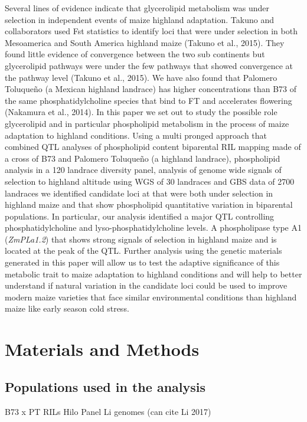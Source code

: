 \documentclass[9pt,twocolumn,twoside,lineno]{gsajnl}
\begin{document}
Several lines of evidence indicate that glycerolipid metabolism was under selection in independent events of maize highland adaptation. 
Takuno and collaborators used Fst statistics to identify loci that were under selection in both Mesoamerica and South America highland maize (Takuno et al., 2015). 
They found little evidence of convergence between the two sub continents but glycerolipid pathways were under the few pathways that showed convergence at the pathway level (Takuno et al., 2015). 
We have also found that Palomero Toluqueño (a Mexican highland landrace) has higher concentrations than B73 of the same phosphatidylcholine species that bind to FT and accelerates flowering (Nakamura et al., 2014).
In this paper we set out to study the possible role glycerolipid and in particular phospholipid metabolism in the process of maize adaptation to highland conditions. 
Using a multi pronged approach that combined QTL analyses of phospholipid content biparental RIL mapping made of a cross of B73 and Palomero Toluqueño (a highland landrace), phospholipid analysis in a 120 landrace diversity panel, analysis of genome wide signals of selection to highland altitude using WGS of 30 landraces and GBS data of 2700 landraces we identified candidate loci at that were both under selection in highland maize and that show phospholipid quantitative variation  in biparental populations. 
In particular, our analysis identified a major QTL controlling phosphatidylcholine and lyso-phosphatidylcholine levels. A phospholipase type A1 (\textit{ZmPLa1.2}) that shows strong signals of selection in highland maize and is located at the peak of the QTL. Further analysis using the genetic materials generated in this paper will allow us to test the adaptive significance of this metabolic trait to maize adaptation to highland conditions and will help to better understand if natural variation in the candidate loci could be used to improve modern maize varieties that face similar environmental conditions than highland maize like early season cold stress. 

\section{Materials and Methods}
\label{sec:materials:methods}

\subsection{Populations used in the analysis } 
B73 x PT RILs
Hilo Panel
Li genomes (can cite Li 2017)
\end{document}
